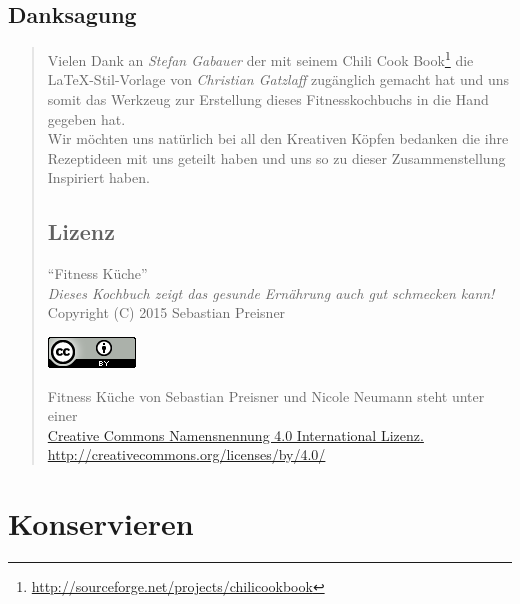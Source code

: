 \documentclass[a4paper]{scrartcl}
\begin{document}
\subsection*{\centering Danksagung}
\begin{quote}
Vielen Dank an \emph{Stefan Gabauer} der mit seinem Chili Cook Book\footnote{\url{http://sourceforge.net/projects/chilicookbook}} die \LaTeX-Stil-Vorlage von \emph{Christian Gatzlaff} zugänglich gemacht hat und uns somit das Werkzeug zur Erstellung dieses Fitnesskochbuchs in die Hand gegeben hat.\\

Wir möchten uns natürlich bei all den Kreativen Köpfen bedanken die ihre Rezeptideen mit uns geteilt haben und uns so zu dieser Zusammenstellung Inspiriert haben.
\vspace{2cm}

\subsection*{\centering Lizenz}
\begin{center}
"`Fitness Küche"'\\
\textit{Dieses Kochbuch zeigt das gesunde Ernährung auch gut schmecken kann!}\\
Copyright (C) 2015 Sebastian Preisner\\

\begin{center}
	\href{http://creativecommons.org/licenses/by-nc-sa/3.0/de/}{\includegraphics{cclogo.png}}
\end{center}

Fitness Küche von Sebastian Preisner und Nicole Neumann steht unter einer\\ \href{http://creativecommons.org/licenses/by/4.0/}{Creative Commons Namensnennung 4.0 International Lizenz.}\\
\url{http://creativecommons.org/licenses/by/4.0/}
\end{center}
\end{quote}


\section{Konservieren} %
\end{document}
